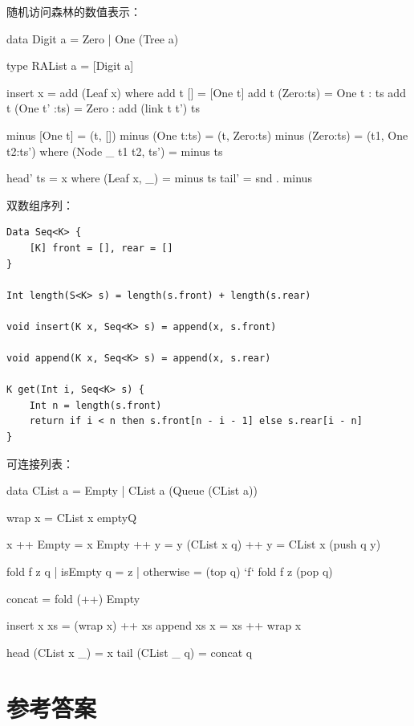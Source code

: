 \documentclass[b5paper]{ctexart}
\begin{document}
随机访问森林的数值表示：
\begin{Haskell}
data Digit a = Zero | One (Tree a)

type RAList a = [Digit a]

insert x = add (Leaf x) where
  add t [] = [One t]
  add t (Zero:ts) = One t : ts
  add t (One t' :ts) = Zero : add (link t t') ts

minus [One t] = (t, [])
minus (One t:ts) = (t, Zero:ts)
minus (Zero:ts) = (t1, One t2:ts') where
    (Node _ t1 t2, ts') = minus ts

head' ts = x where (Leaf x, _) = minus ts
tail' = snd . minus
\end{Haskell}

双数组序列：

\begin{lstlisting}[language = Bourbaki]
Data Seq<K> {
    [K] front = [], rear = []
}

Int length(S<K> s) = length(s.front) + length(s.rear)

void insert(K x, Seq<K> s) = append(x, s.front)

void append(K x, Seq<K> s) = append(x, s.rear)

K get(Int i, Seq<K> s) {
    Int n = length(s.front)
    return if i < n then s.front[n - i - 1] else s.rear[i - n]
}
\end{lstlisting}

可连接列表：

\begin{Haskell}
data CList a = Empty | CList a (Queue (CList a))

wrap x = CList x emptyQ

x ++ Empty = x
Empty ++ y = y
(CList x q) ++ y = CList x (push q y)

fold f z q | isEmpty q = z
           | otherwise = (top q) `f` fold f z (pop q)

concat = fold (++) Empty

insert x xs = (wrap x) ++ xs
append xs x = xs ++ wrap x

head (CList x _) = x
tail (CList _ q) = concat q
\end{Haskell}

\ifx\wholebook\relax \else
\section{参考答案}
\shipoutAnswer
\end{document}
